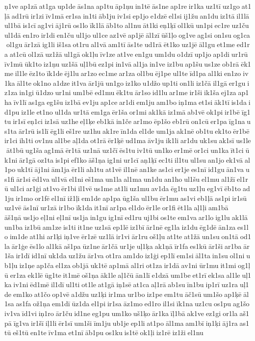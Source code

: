 ņ1ve ap1zā at1ga up1de ās1na ap1tu āp1ņu in1tē ās1ne ap1re ir1ka uz1tī uz1go at1ļā ad1rū ir1zi īv1mā er1sa in1ti āb1ju iv1si ep1jo e1dzē el1si ij1žu an1du iz1tā il1lā ul1bā is1cī ag1vi āj1rū os1lo īk1lā āb1to al1nu āt1ki eņ1ķī ol1kū un1pi ec1re uz1ču ul1dā en1ro ir1di en1ču ul1jo ul1ce az1vē ap1jē āl1zī ūš1ļo og1ve ag1si on1su og1ca ol1gu ār1zā ig1li iš1sa ot1ru al1vā am1tī ās1te ud1rā ēt1ko uz1jē āl1gu et1me ed1ra at1cū ol1zā uz1žā ul1gā ok1ļu īv1ze at1ve en1gu um1du o1dzī up1jo ap1di ur1rū īv1mū ūk1to iz1ņu uz1šā uļ1bū ez1pi in1vā al1ja in1ve iz1bu ap1šu us1ze ob1rā ēk1me il1le ēz1to īk1de ēj1lu ar1zo ec1me ar1za ol1bu ēj1pe ul1te īd1pa al1ki en1zo iv1ka āl1te ok1no a1dze it1va ār1jū un1go iz1ko u1džo up1ti on1li iz1čā il1gā er1gu iz1za in1gi ū1dzo ur1ni um1bē ed1mu ēk1tu ār1so id1lu ar1me ir1ši ik1ša ej1za ap1ha īv1lī as1ga eg1šu iz1bā ev1ju ap1ce ar1di em1ju am1bo iņ1ma et1si āk1tī is1da id1pu iz1le et1no ul1da ur1tā em1ga ēr1ša or1mi ak1kā iz1mā ab1vē ok1pi ir1bē īg1tu ir1sī eņ1ci iz1sā uz1he eļ1ķe eb1kā in1če ar1mo ēp1šo eb1rū on1cū er1pa īg1na us1ta ār1rū is1lī ēg1li eš1re uz1hu ak1re īn1da el1de um1ja ak1nē ob1tu ek1to ēr1bē ir1ci ih1ti ov1nu al1be aļ1da ot1rā ēr1ķē ud1ma āv1ju ik1li ar1du uk1su ak1sī us1le āt1bū ug1ša ag1mā ēr1tā uz1nā uz1čī ēs1tu iv1tū un1ko er1mē or1ci un1ka īt1ci ūk1ni ār1gā oz1ta is1pi ef1ko āš1ņa ig1ni ur1cī aņ1ķī ec1ti il1tu ul1su an1jo ek1vā al1po uk1tī āj1ni ām1ja ēr1li ah1tu at1vē il1nē an1ke as1ci er1je es1nī id1gu ān1va us1fi ār1si ēd1va ul1vā el1ni eš1ma un1la al1ma un1du an1ho ul1šu el1mu al1žī el1rū ul1ci ar1ģi at1vo ēr1bi il1vē us1me at1li uz1mu av1da ēg1tu uz1ļu eg1vī ēb1to ad1ju ir1mo or1fē el1nī iž1ļi em1de ap1pa ūg1ša ul1bu ēr1mu as1vi eb1ļā as1pi ir1sū uz1vē ās1nī ur1zā ir1bo īk1da it1nī ar1pa el1do ēr1le or1fi ēt1la aļ1ļi am1bā 	āš1ņā us1jo eļ1ni eļ1nī us1ja in1gu ig1nī ed1ru uj1bi os1te em1va ar1lo ig1lu ak1lā un1ba iz1bū am1ze is1ti it1ne uz1sā ep1lē iz1bī ār1nē eg1la iz1du ēg1dē ān1za es1lo im1de at1hi ar1ķi iņ1ve ēr1zē uz1lā ir1vi ār1ru oš1ļu at1te at1žā un1su on1tā od1la ār1ģe ēs1lo al1kā aš1pa ūz1ne ār1čā ur1je uļ1ķa ak1ņā īr1fa es1kū ār1ši ar1ba ār1ša ir1dī id1nī uk1da uz1žu ār1va ot1ra am1do iz1ģi ep1lī em1si āl1ta in1su ol1ni ub1ļu iz1ņe ap1ča el1za ob1jā uk1tē ap1mā al1ri ot1za ir1dā av1ni ūr1mu it1mi og1ļū er1za ek1lē ūg1te it1mē oš1ņa āk1le aļ1čū ān1lī e1dzā um1be et1rī ek1sa al1le uļ1ka iv1ni ēd1mē il1dī ul1ti ot1le at1gā iņ1sē at1ca aļ1rā ab1su īn1bu ip1rī uz1ra uļ1de em1ko at1čo op1vē a1džu uz1ķi ir1ma ur1bo iz1pe em1tu āč1sū um1šo ap1ķē āl1sa as1fa ož1ņa em1dī ūz1da el1pi ir1sa āz1mo ed1ro il1si īk1na uz1cu os1pu ag1šo iv1va īd1vi iņ1ro ār1ču id1ne eg1pu um1ko uš1ķo ār1ka īļ1bā ak1ve ez1gi or1la aš1pā īg1va ir1šī iļ1li ēr1sī um1ši īm1ju ub1je ep1li at1po āl1ma am1bī iņ1ķi āj1ra as1tū eš1tū en1te īv1ma et1nī āb1pu os1ku is1tē ok1ļi iz1rē iz1ži el1nu